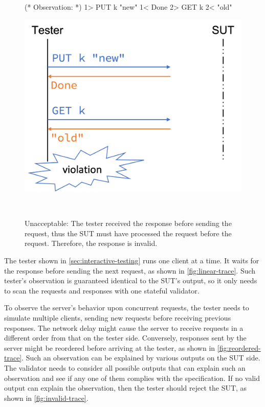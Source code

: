 \begin{figure}
  \centering
  \begin{minipage}[c]{.3\textwidth}
\begin{coq}
  (* Observation: *)
  1> PUT k "new"
  1< Done
  2> GET k
  2< "old"
\end{coq}
  \end{minipage}\begin{minipage}[c]{.35\textwidth}
  \includegraphics[width=\linewidth]{figures/invalid-trace}
  \end{minipage}\begin{minipage}[c]{.3\textwidth}\
  \end{minipage}
  \caption[Invalid trace that violates the specification.]{Unacceptable: The
    tester received the \ilc{Done} response before sending the 
    request, thus the SUT must have processed the \ilc{PUT} request before the
    \ilc{GET} request.  Therefore, the \ilc{"old"} response is invalid.}
  \label{fig:invalid-trace}
\end{figure}
The tester shown in \autoref{sec:interactive-testing} runs one client at a time.
It waits for the response before sending the next request, as shown in
\autoref{fig:linear-trace}.  Such tester's observation is guaranteed identical
to the SUT's output, so it only needs to scan the requests and responses with
one stateful validator.

To observe the server's behavior upon concurrent requests, the tester needs to
simulate multiple clients, sending new requests before receiving previous
responses.  The network delay might cause the server to receive requests in a
different order from that on the tester side.  Conversely, responses sent by the
server might be reordered before arriving at the tester, as shown in
\autoref{fig:reordered-trace}.  Such an observation can be explained by various
outputs on the SUT side.  The validator needs to consider all possible outputs
that can explain such an observation and see if any one of them complies with
the specification.  If no valid output can explain the observation, then the
tester should reject the SUT, as shown in \autoref{fig:invalid-trace}.


